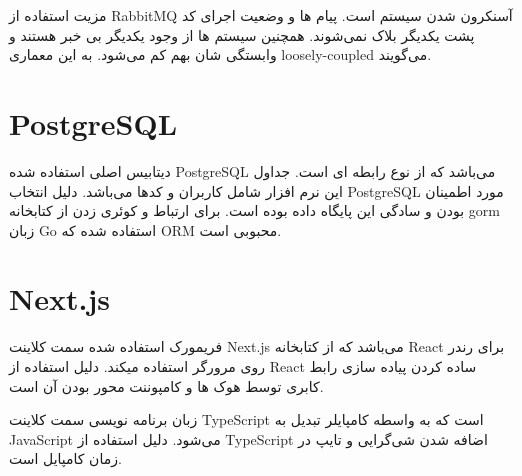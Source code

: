 مزیت استفاده از RabbitMQ آسنکرون شدن سیستم است. پیام ها و وضعیت اجرای کد پشت یکدیگر بلاک نمی‌شوند.
همچنین سیستم ها از وجود یکدیگر بی خبر هستند و وابستگی شان بهم کم می‌شود. به این معماری loosely-coupled می‌گویند.

\section{PostgreSQL}
دیتابیس اصلی استفاده شده PostgreSQL می‌باشد که از نوع رابطه ای است.
جداول این نرم افزار شامل کاربران و کدها می‌باشد.
دلیل انتخاب PostgreSQL مورد اطمینان بودن و سادگی این پایگاه داده بوده است.
برای ارتباط و کوئری زدن از کتابخانه gorm زبان Go استفاده شده که ORM محبوبی  است.

\section{Next.js}
فریمورک استفاده شده سمت کلاینت Next.js می‌باشد که از کتابخانه React برای رندر روی مرورگر استفاده میکند.
دلیل استفاده از React ساده کردن پیاده سازی رابط کابری توسط هوک ها و کامپوننت محور بودن آن است.

زبان برنامه نویسی سمت کلاینت TypeScript است که به واسطه کامپایلر تبدیل به JavaScript می‌شود.
دلیل استفاده از TypeScript اضافه شدن شی‌گرایی و تایپ در زمان کامپایل است.
